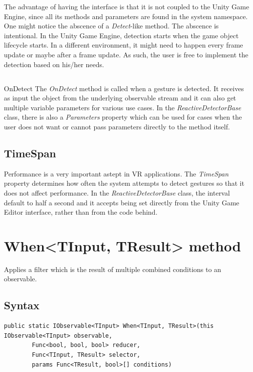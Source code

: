 \documentclass[12pt,a4paper,twoside]{report}
\begin{document}
The advantage of having the interface is that it is not coupled to the Unity Game Engine, since all its methods and parameters are found in the system namespace. One might notice the abscence of a \textit{Detect}-like method. The abscence is intentional. In the Unity Game Engine, detection starts when the game object lifecycle starts. In a different environment, it might need to happen every frame update or maybe after a frame update. As such, the user is free to implement the detection based on his/her needs.

\subsection{}{OnDetect}
The \textit{OnDetect} method is called when a gesture is detected. It receives as input the object from the underlying observable stream and it can also get multiple variable parameters for various use cases. In the \textit{ReactiveDetectorBase} class, there is also a \textit{Parameters} property which can be used for cases when the user does not want or cannot pass parameters directly to the method itself.

\subsection{TimeSpan}
Performance is a very important astept in VR applications. The \textit{TimeSpan} property determines how often the system attempts to detect gestures so that it does not affect performance. In the \textit{ReactiveDetectorBase} class, the interval default to half a second and it accepts being set directly from the Unity Game Editor interface, rather than from the code behind.

\section{When<TInput, TResult> method}

Applies a filter which is the result of multiple combined conditions to an observable.

\subsection{Syntax}

\begin{lstlisting}[caption=Declaration]
    public static IObservable<TInput> When<TInput, TResult>(this IObservable<TInput> observable,
        Func<bool, bool, bool> reducer,
        Func<TInput, TResult> selector,
        params Func<TResult, bool>[] conditions) 
\end{lstlisting}
\end{document}
